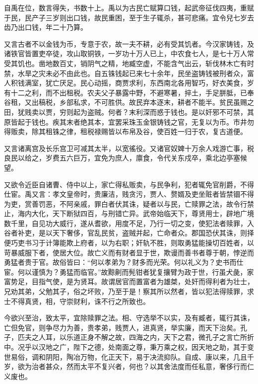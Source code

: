 \documentclass[12pt,UTF8]{ctexbook}
\begin{document}
自禹在位，数言得失，书数十上。禹以为古民亡赋算口钱，起武帝征伐四夷，重赋于民，民产子三岁则出口钱，故民重困，至于生子辄杀，甚可悲痛。宜令兒七岁去齿乃出口钱，年二十乃算。



又言古者不以金钱为币，专意于农，故一夫不耕，必有受其饥者。今汉家铸钱，及诸铁官皆置吏卒徒，攻山取铜铁，一岁功十万人已上，中农食七人，是七十万人常受其饥也。凿地数百丈，销阴气之精，地臧空虚，不能含气出云，斩伐林木亡有时禁，水旱之灾未必不由此也。自五铢钱起已来七十余年，民坐盗铸钱被刑者众，富人积钱满室，犹亡厌足。民心动摇，商贾求利，东西南北各用智巧，好衣美食，岁有十二之利，而不出租税。农夫父子暴露中野，不避寒暑，捽土，手足胼胝，已奉谷租，又出稿税，乡部私求，不可胜供。故民弃本逐末，耕者不能半。贫民虽赐之田，犹贱卖以贾，穷则起为盗贼。何者？末利深而惑于钱也。是以奸邪不可禁，其原皆起于钱也。疾其末者绝其本，宜罢采珠玉金银铸钱之官，无复以为币。市井勿得贩卖，除其租铢之律，租税禄赐皆以布帛及谷，使百姓一归于农，复古道便。



又言诸离宫及长乐宫卫可减其太半，以宽徭役。又诸官奴婢十万余人戏游亡事，税良民以给之，岁费五六巨万，宜免为庶人，廪食，令代关东戍卒，乘北边亭塞候望。



又欲令近臣自诸曹、侍中以上，家亡得私贩卖，与民争利，犯者辄免官削爵，不得仕宦。禹又言：孝文皇帝时，贵廉洁，贱贪污，贾人、赘婿及吏坐赃者皆禁锢不得为吏，赏善罚恶，不阿亲戚，罪白者伏其诛，疑者以与民，亡赎罪之法，故令行禁止，海内大化，天下断狱四百，与刑错亡异。武帝始临天下，尊贤用士，辟地广境数千里，自见功大威行，遂从耆欲，用度不足，乃行一切之变，使犯法者赎罪，入谷者补吏，是以天下奢侈，官乱民贫，盗贼并起，亡命者众。郡国恐伏其诛，则择便巧吏书习于计簿能欺上府者，以为右职；奸轨不胜，则取勇猛能操切百姓者，以苛暴威服下者，使居大位。故亡义而有财者显于世，欺谩而善书者尊于朝，悖逆而勇猛者贵于官。故俗皆曰：“何以孝弟为？财多而光荣。何以礼义为？史书而仕宦。何以谨慎为？勇猛而临官。”故黥劓而髡钳者犹复攘臂为政于世，行虽犬彘，家富势足，目指气使，是为贤耳。故谓居官而置富者为雄桀，处奸而得利者为壮士，兄劝其弟，父勉其子，俗之坏败，乃至于是！察其所以然者，皆以犯法得赎罪，求士不得真贤，相，守崇财利，诛不行之所致也。



今欲兴至治，致太平，宜除赎罪之法。相、守选举不以实，及有臧者，辄行其诛，亡但免官，则争尽力为善，贵孝弟，贱贾人，进真贤，举实廉，而天下治矣。孔子，匹夫之人耳，以乐道正身不解之故，四海之内，天下之君，微孔子之言亡所折中。况乎以汉地之广，陛下之德，处南面之尊，秉万乘之权，因天地之助，其于变世易俗，调和阴阳，陶冶万物，化正天下，易于决流抑队。自成、康以来，几且千岁，欲为治者甚众，然而太平不复兴者，何也？以其舍法度而任私意，奢侈行而仁义废也。
\end{document}
